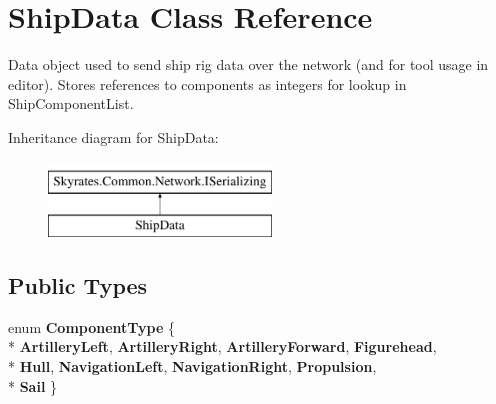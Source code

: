\hypertarget{class_ship_data}{\section{Ship\-Data Class Reference}
\label{class_ship_data}
}


Data object used to send ship rig data over the network (and for tool usage in editor). Stores references to components as integers for lookup in Ship\-Component\-List.  


Inheritance diagram for Ship\-Data\-:\begin{figure}[H]
\begin{center}
\leavevmode
\includegraphics[height=2.000000cm]{class_ship_data}
\end{center}
\end{figure}
\subsection*{Public Types}
\begin{DoxyCompactItemize}
\item 
enum {\bfseries Component\-Type} \{ \\*
{\bfseries Artillery\-Left}, 
{\bfseries Artillery\-Right}, 
{\bfseries Artillery\-Forward}, 
{\bfseries Figurehead}, 
\\*
{\bfseries Hull}, 
{\bfseries Navigation\-Left}, 
{\bfseries Navigation\-Right}, 
{\bfseries Propulsion}, 
\\*
{\bfseries Sail}
 \}
\end{DoxyCompactItemize}
